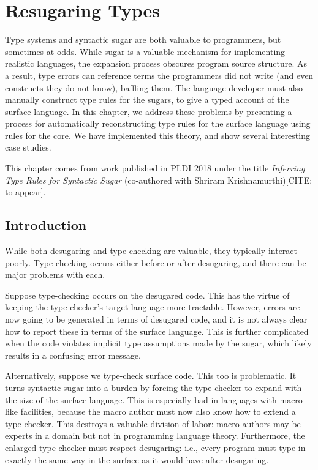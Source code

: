 \chapter{Resugaring Types}\label{chap:resugar-types}

\newcommand{\reflem}[1]{lemma \ref{lemma:rtype-#1} (#1)}
\newcommand{\Reflem}[1]{Lemma \ref{lemma:rtype-#1} (#1)}
\newcommand{\refass}[1]{assumption \ref{assumption:rtype-#1} (#1)}
\newcommand{\Refass}[1]{Assumption \ref{assumption:rtype-#1} (#1)}


Type systems and syntactic sugar are both valuable to programmers, but
sometimes at odds. While sugar is a valuable mechanism for
implementing realistic languages, the expansion process obscures
program source structure. As a result, type errors can reference terms
the programmers did not write (and even constructs they do not know),
baffling them. The language developer must also manually construct
type rules for the sugars, to give a typed account of the surface
language. In this chapter, we address these problems by presenting a
process for automatically reconstructing type rules for the surface
language using rules for the core. We have implemented this theory,
and show several interesting case studies.

This chapter comes from work published in PLDI 2018 under the title
\emph{Inferring Type Rules for Syntactic Sugar} (co-authored with
Shriram Krishnamurthi)[CITE: to appear].

\section{Introduction}

While both desugaring and type checking are valuable, they typically
interact poorly. Type checking occurs either before or after
desugaring, and there can be major problems with each.

Suppose type-checking occurs on the desugared code. This has the
virtue of keeping the type-checker's target language more
tractable. However, errors are now going to be generated in terms of
desugared code, and it is not always clear how to report these in
terms of the surface language. This is further complicated when the
code violates implicit type assumptions made by the sugar, which
likely results in a confusing error message.

Alternatively, suppose we type-check surface code. This too is
problematic. It turns syntactic sugar into a burden by
forcing the type-checker to expand with the size of the surface
language. This is especially bad in languages with macro-like
facilities, because the macro author must now also know how to extend
a type-checker. This destroys a valuable division of labor: macro
authors may be experts in a domain but not in programming language
theory.  Furthermore, the enlarged type-checker must respect
desugaring: i.e., every program must type in exactly the same way in
the surface as it would have after desugaring.

